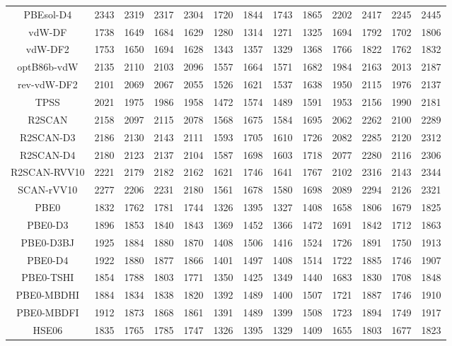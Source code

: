 \begin{table}[ht]
\begin{tabular}{ccccccccccccc}
PBEsol-D4 & 2343 & 2319 & 2317 & 2304 & 1720 & 1844 & 1743 & 1865 & 2202 & 2417 & 2245 & 2445 \\ 
vdW-DF & 1738 & 1649 & 1684 & 1629 & 1280 & 1314 & 1271 & 1325 & 1694 & 1792 & 1702 & 1806 \\ 
vdW-DF2 & 1753 & 1650 & 1694 & 1628 & 1343 & 1357 & 1329 & 1368 & 1766 & 1822 & 1762 & 1832 \\ 
optB86b-vdW & 2135 & 2110 & 2103 & 2096 & 1557 & 1664 & 1571 & 1682 & 1984 & 2163 & 2013 & 2187 \\ 
rev-vdW-DF2 & 2101 & 2069 & 2067 & 2055 & 1526 & 1621 & 1537 & 1638 & 1950 & 2115 & 1976 & 2137 \\ 
TPSS & 2021 & 1975 & 1986 & 1958 & 1472 & 1574 & 1489 & 1591 & 1953 & 2156 & 1990 & 2181 \\ 
R2SCAN & 2158 & 2097 & 2115 & 2078 & 1568 & 1675 & 1584 & 1695 & 2062 & 2262 & 2100 & 2289 \\ 
R2SCAN-D3 & 2186 & 2130 & 2143 & 2111 & 1593 & 1705 & 1610 & 1726 & 2082 & 2285 & 2120 & 2312 \\ 
R2SCAN-D4 & 2180 & 2123 & 2137 & 2104 & 1587 & 1698 & 1603 & 1718 & 2077 & 2280 & 2116 & 2306 \\ 
R2SCAN-RVV10 & 2221 & 2179 & 2182 & 2162 & 1621 & 1746 & 1641 & 1767 & 2102 & 2316 & 2143 & 2344 \\ 
SCAN-rVV10 & 2277 & 2206 & 2231 & 2180 & 1561 & 1678 & 1580 & 1698 & 2089 & 2294 & 2126 & 2321 \\ 
PBE0 & 1832 & 1762 & 1781 & 1744 & 1326 & 1395 & 1327 & 1408 & 1658 & 1806 & 1679 & 1825 \\ 
PBE0-D3 & 1896 & 1853 & 1840 & 1843 & 1369 & 1452 & 1366 & 1472 & 1691 & 1842 & 1712 & 1863 \\ 
PBE0-D3BJ & 1925 & 1884 & 1880 & 1870 & 1408 & 1506 & 1416 & 1524 & 1726 & 1891 & 1750 & 1913 \\ 
PBE0-D4 & 1922 & 1880 & 1877 & 1866 & 1401 & 1497 & 1408 & 1514 & 1722 & 1885 & 1746 & 1907 \\ 
PBE0-TSHI & 1854 & 1788 & 1803 & 1771 & 1350 & 1425 & 1349 & 1440 & 1683 & 1830 & 1708 & 1848 \\ 
PBE0-MBDHI & 1884 & 1834 & 1838 & 1820 & 1392 & 1489 & 1400 & 1507 & 1721 & 1887 & 1746 & 1910 \\ 
PBE0-MBDFI & 1912 & 1873 & 1868 & 1861 & 1391 & 1489 & 1399 & 1508 & 1723 & 1894 & 1749 & 1917 \\ 
HSE06 & 1835 & 1765 & 1785 & 1747 & 1326 & 1395 & 1329 & 1409 & 1655 & 1803 & 1677 & 1823 \\ 

\end{tabular}
\end{table}
